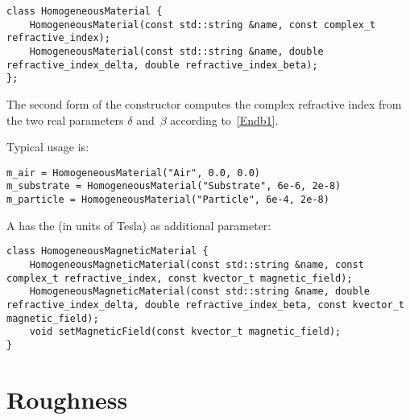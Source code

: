 \setCpp
\begin{lstlisting}
class HomogeneousMaterial {
    HomogeneousMaterial(const std::string &name, const complex_t refractive_index);
    HomogeneousMaterial(const std::string &name, double refractive_index_delta, double refractive_index_beta);
};
\end{lstlisting}

The second form of the constructor computes the complex refractive index
%
from the two real parameters $\delta$ and~$\beta$ according to~\cref{Endb1}.

Typical usage is:

\setPy
\begin{lstlisting}
m_air = HomogeneousMaterial("Air", 0.0, 0.0)
m_substrate = HomogeneousMaterial("Substrate", 6e-6, 2e-8)
m_particle = HomogeneousMaterial("Particle", 6e-4, 2e-8)
\end{lstlisting}

A  has the  (in units of Tesla)
%
as additional parameter:

\setCpp
\begin{lstlisting}
class HomogeneousMagneticMaterial {
    HomogeneousMagneticMaterial(const std::string &name, const complex_t refractive_index, const kvector_t magnetic_field);
    HomogeneousMagneticMaterial(const std::string &name, double refractive_index_delta, double refractive_index_beta, const kvector_t magnetic_field);
    void setMagneticField(const kvector_t magnetic_field);
}
\end{lstlisting}

\section{Roughness}\label{SRefRough}

\MissingSection
